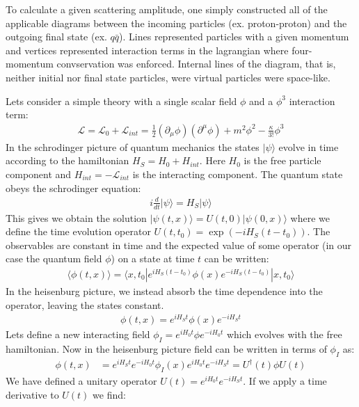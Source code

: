 To calculate a given scattering amplitude, one simply constructed all of the applicable diagrams between
the incoming particles (ex. proton-proton) and the outgoing final state  (ex. $q\bar{q}$). Lines represented particles with a given momentum and vertices represented
interaction terms in the lagrangian where four-momentum convservation was enforced. Internal 
lines of the diagram, that is, neither initial nor final state particles, were virtual 
particles were space-like. 

Lets consider a simple theory with a single scalar field $\phi$ and a $\phi^3$ interaction term:
\begin{align*}
\mathcal{L} = \mathcal{L}_0 + \mathcal{L}_{int} = \frac{1}{2}(\partial_\mu \phi) (\partial^\mu \phi) + m^2 \phi^2 - \frac{\kappa}{3!} \phi^3 
\end{align*}
In the schrodinger picture of quantum mechanics the states $|\psi \rangle$  evolve in time 
according to the hamiltonian $H_S=H_0+H_{int}.$  Here $H_0$ is the free particle component and $H_{int} = - \mathcal{L}_{int}$ is the interacting component. The quantum state obeys the schrodinger equation:
\begin{align*}
i\frac{d}{dt} |\psi \rangle = H_S | \psi \rangle
\end{align*}
This gives we obtain the solution $|\psi(t,x) \rangle =  U(t,0)| \psi(0,x) \rangle$ where we define
the time evolution operator $U(t,t_0) = \exp{(-iH_S (t-t_0))}$.  The observables are constant in time
and the expected value of some operator (in our case the quantum field $\phi$) on a state
at time $t$ can be written:
\begin{align*}
\langle \phi(t,x) \rangle = \langle x,t_0 | e^{iH_S(t-t_0)} \phi(x) e^{-iH_S(t-t_0)} | x,t_0 \rangle 
\end{align*}
In the heisenburg picture, we instead absorb the time dependence into the operator, leaving the states constant.
\begin{align*}
 \phi(t,x) =   e^{iH_St} \phi(x)  e^{-iH_St}
\end{align*}
Lets define a new interacting field $\phi_I = e^{iH_0t} \phi  e^{-iH_0t}$ which evolves
 with the free hamiltonian. Now in the heisenburg picture field can be written in terms of $\phi_I$ as:
\begin{align*}
 \phi(t,x) &=   e^{iH_St}e^{-iH_0t} \phi_I(x) e^{iH_0t} e^{-iH_St} = U^\dagger(t) \phi U(t)
\end{align*}
We have defined a unitary operator $U(t)=e^{iH_0t}e^{-iH_St}$. If we apply a time derivative to $U(t)$ we find:
